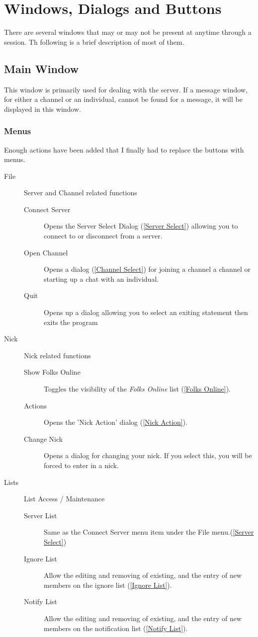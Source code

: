 \documentclass[titlepage]{article}
\begin{document}
\section{Windows, Dialogs and Buttons}

There are several windows that may or may not be present at anytime
through a session. Th following is a brief description of most of
them.

\subsection{Main Window}
This window is primarily used for dealing with the server. If a
message window, for either a channel or an individual, cannot be found
for a message, it will be displayed in this window.
\subsubsection{Menus}
Enough actions have been added that I finally had to replace the buttons
with menus. 
\begin{description}
\item[File] Server and Channel related functions
\begin{description}
\item[Connect Server] Opens the Server Select Dialog (\ref{Server Select})
allowing you to connect to or disconnect from a server.
\item[Open Channel] Opens a dialog (\ref{Channel Select}) for joining a
channel a channel or starting up a chat with an individual.
\item[Quit] Opens up a dialog allowing you to select an exiting statement
then exits the program
\end{description}

\item[Nick] Nick related functions
\begin{description}
\item[Show Folks Online] Toggles the visibility of the \emph{Folks Online}
list (\ref{Folks Online}).
\item[Actions] Opens the 'Nick Action' dialog (\ref{Nick Action}). 
\item[Change Nick] Opens a dialog for changing your nick. If you select
this, you will be forced to enter in a nick.
\end{description}

\item[Lists] List Access / Maintenance
\begin{description}
\item[Server List] Same as the Connect Server menu item under the File
menu.(\ref{Server Select})
\item[Ignore List] Allow the editing and removing of existing, and the
entry of new members on the ignore list (\ref{Ignore List}). 
\item[Notify List] Allow the editing and removing of existing, and the
entry of new members on the notification list (\ref{Notify List}). 
\end{description}
\end{description}
\end{document}
